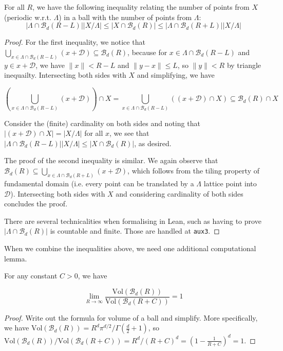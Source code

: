 \begin{lemma}\label{lemma:periodic-points-bounds}\leanok
  For all $R$, we have the following inequality relating the number of points from $X$ (periodic w.r.t. $\Lambda$) in a ball with the number of points from $\Lambda$:
  \[
    \left|\Lambda \cap \mathcal{B}_d(R - L)\right|\left|X / \Lambda\right|
    \leq \left|X \cap \mathcal{B}_d(R)\right|
    \leq \left|\Lambda \cap \mathcal{B}_d(R + L)\right|\left|X / \Lambda\right|
  \]
\end{lemma}
\begin{proof}\leanok
  For the first inequality, we notice that $\bigcup_{x \in \Lambda \cap \mathcal{B}_d(R - L)} (x + \mathcal{D}) \subseteq \mathcal{B}_d(R)$, because for $x \in \Lambda \cap \mathcal{B}_d(R - L)$ and $y \in x + \mathcal{D}$, we have $\|x\| < R - L$ and $\|y - x\| \leq L$, so $\|y\| < R$ by triangle inequailty. Intersecting both sides with $X$ and simplifying, we have

  \[
    \left(\bigcup_{x \in \Lambda \cap \mathcal{B}_d(R - L)} (x + \mathcal{D})\right) \cap X = \bigcup_{x \in \Lambda \cap \mathcal{B}_d(R - L)} ((x + \mathcal{D}) \cap X) \subseteq \mathcal{B}_d(R) \cap X
  \]

  Consider the (finite) cardinality on both sides and noting that $|(x + \mathcal{D}) \cap X| = |X / \Lambda|$ for all $x$, we see that $|\Lambda \cap \mathcal{B}_d(R - L)||X / \Lambda| \leq |X \cap \mathcal{B}_d(R)|$, as desired.

  The proof of the second inequality is similar. We again observe that $\mathcal{B}_d(R) \subseteq \bigcup_{x \in \Lambda \cap \mathcal{B}_d(R + L)} (x + \mathcal{D})$, which follows from the tiling property of fundamental domain (i.e. every point can be translated by a $\Lambda$ lattice point into $\mathcal{D}$). Intersecting both sides with $X$ and considering cardinality of both sides concludes the proof.

  There are several technicalities when formalising in Lean, such as having to prove $|\Lambda \cap \mathcal{B}_d(R)|$ is countable and finite. Those are handled at \texttt{aux3}.
\end{proof}

When we combine the inequalities above, we need one additional computational lemma.

\begin{lemma}\label{lemma:volume-ball-ratio-limit}\leanok
  For any constant $C > 0$, we have

  \[
    \lim_{R \to \infty} \frac{\mathrm{Vol}(\mathcal{B}_d(R))}{\mathrm{Vol}(\mathcal{B}_d(R + C))} = 1
  \]
\end{lemma}
\begin{proof}
  Write out the formula for volume of a ball and simplify. More specifically, we have $\mathrm{Vol}(\mathcal{B}_d(R)) = R^d \pi^{d / 2} / \Gamma\left(\frac{d}{2} + 1\right)$, so $\mathrm{Vol}(\mathcal{B}_d(R)) / \mathrm{Vol}(\mathcal{B}_d(R + C)) = R^d / (R + C)^d = \left(1 - \frac{1}{R + C}\right)^d = 1$.
\end{proof}

